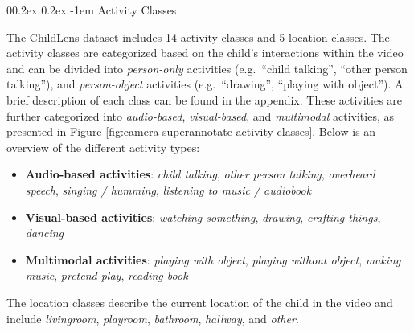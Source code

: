\documentclass[
  man,floatsintext]{apa6}
\makeatletter
\providecommand{\tightlist}{%
  \setlength{\itemsep}{0pt}\setlength{\parskip}{0pt}}
\let\oldparagraph\paragraph
\renewcommand{\paragraph}{
    \@ifstar
      \xxxParagraphStar
      \xxxParagraphNoStar
  }
\newcommand{\xxxParagraphStar}[1]{\oldparagraph*{#1}\mbox{}}
\newcommand{\xxxParagraphNoStar}[1]{\oldparagraph{#1}\mbox{}}
\renewcommand{\paragraph}{\@startsection{paragraph}{4}{\parindent}%
  {0\baselineskip \@plus 0.2ex \@minus 0.2ex}%
  {-1em}%
  {\normalfont\normalsize\bfseries\itshape\typesectitle}}
\makeatother
\begin{document}
\paragraph{Activity Classes}\label{activity-classes}

The ChildLens dataset includes 14 activity classes and 5 location classes. The activity classes are categorized based on the child's interactions within the video and can be divided into \emph{person-only} activities (e.g.~``child talking'', ``other person talking''), and \emph{person-object} activities (e.g.~``drawing'', ``playing with object''). A brief description of each class can be found in the appendix. These activities are further categorized into \emph{audio-based}, \emph{visual-based}, and \emph{multimodal} activities, as presented in Figure \ref{fig:camera-superannotate-activity-classes}. Below is an overview of the different activity types:

\begin{itemize}
\tightlist
\item
  \textbf{Audio-based activities}: \emph{child talking}, \emph{other person talking}, \emph{overheard speech}, \emph{singing / humming}, \emph{listening to music / audiobook}
\item
  \textbf{Visual-based activities}: \emph{watching something}, \emph{drawing}, \emph{crafting things}, \emph{dancing}
\item
  \textbf{Multimodal activities}: \emph{playing with object}, \emph{playing without object}, \emph{making music}, \emph{pretend play}, \emph{reading book}
\end{itemize}

The location classes describe the current location of the child in the video and include \emph{livingroom}, \emph{playroom}, \emph{bathroom}, \emph{hallway}, and \emph{other}.
\end{document}
